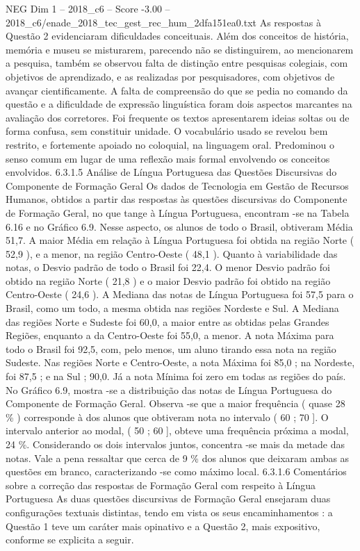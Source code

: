 \begin{textsample}{NEG Dim 1 – 2018\_c6 – Score -3.00 – 2018\_c6/enade\_2018\_tec\_gest\_rec\_hum\_2dfa151ea0.txt}
As respostas à Questão 2 evidenciaram dificuldades conceituais.
Além dos conceitos de história, memória e museu se misturarem, parecendo não se distinguirem, ao mencionarem a pesquisa, também se observou falta de distinção entre pesquisas colegiais, com objetivos de aprendizado, e as realizadas por pesquisadores, com objetivos de avançar cientificamente.
A falta de compreensão do que se pedia no comando da questão e a dificuldade de expressão linguística foram dois aspectos marcantes na avaliação dos corretores.
Foi frequente os textos apresentarem ideias soltas ou de forma confusa, sem constituir unidade.
O vocabulário usado se revelou bem restrito, e fortemente apoiado no coloquial, na linguagem oral.
Predominou o senso comum em lugar de uma reflexão mais formal envolvendo os conceitos envolvidos. 6.3.1.5 Análise de Língua Portuguesa das Questões Discursivas do Componente de Formação Geral Os dados de Tecnologia em Gestão de Recursos Humanos, obtidos a partir das respostas às questões discursivas do Componente de Formação Geral, no que tange à Língua Portuguesa, encontram -se na Tabela 6.16 e no Gráfico 6.9.
Nesse aspecto, os alunos de todo o Brasil, obtiveram Média 51,7.
A maior Média em relação à Língua Portuguesa foi obtida na região Norte ( 52,9 ), e a menor, na região Centro-Oeste ( 48,1 ).
Quanto à variabilidade das notas, o Desvio padrão de todo o Brasil foi 22,4.
O menor Desvio padrão foi obtido na região Norte ( 21,8 ) e o maior Desvio padrão foi obtido na região Centro-Oeste ( 24,6 ).
A Mediana das notas de Língua Portuguesa foi 57,5 para o Brasil, como um todo, a mesma obtida nas regiões Nordeste e Sul.
A Mediana das regiões Norte e Sudeste foi 60,0, a maior entre as obtidas pelas Grandes Regiões, enquanto a da Centro-Oeste foi 55,0, a menor.
A nota Máxima para todo o Brasil foi 92,5, com, pelo menos, um aluno tirando essa nota na região Sudeste.
Nas regiões Norte e Centro-Oeste, a nota Máxima foi 85,0 ; na Nordeste, foi 87,5 ; e na Sul ; 90,0.
Já a nota Mínima foi zero em todas as regiões do país.
No Gráfico 6.9, mostra -se a distribuição das notas de Língua Portuguesa do Componente de Formação Geral.
Observa -se que a maior frequência ( quase 28 \% ) corresponde à dos alunos que obtiveram nota no intervalo ( 60 ; 70 ].
O intervalo anterior ao modal, ( 50 ; 60 ], obteve uma frequência próxima a modal, 24 \%.
Considerando os dois intervalos juntos, concentra -se mais da metade das notas.
Vale a pena ressaltar que cerca de 9 \% dos alunos que deixaram ambas as questões em branco, caracterizando -se como máximo local. 6.3.1.6 Comentários sobre a correção das respostas de Formação Geral com respeito à Língua Portuguesa As duas questões discursivas de Formação Geral ensejaram duas configurações textuais distintas, tendo em vista os seus encaminhamentos : a Questão 1 teve um caráter mais opinativo e a Questão 2, mais expositivo, conforme se explicita a seguir.

\end{textsample}
